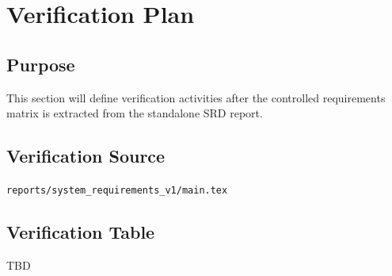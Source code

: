 \chapter{Verification Plan}

\section{Purpose}

This section will define verification activities after the controlled requirements matrix is extracted from the standalone SRD report.

\section{Verification Source}

\begin{center}
\texttt{reports/system\_requirements\_v1/main.tex}
\end{center}

\section{Verification Table}

TBD

